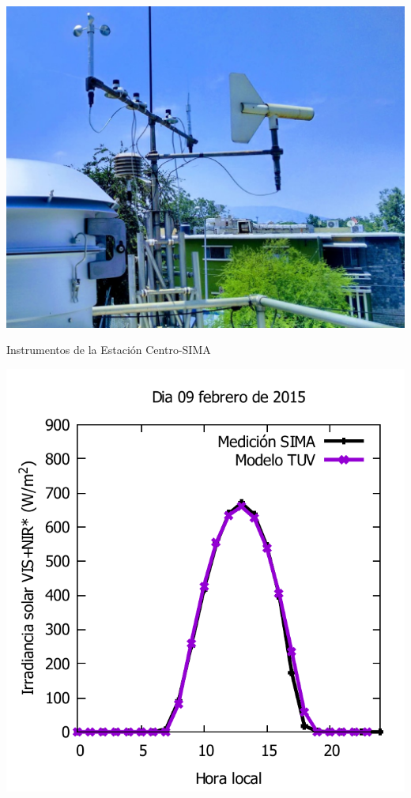 \documentclass{article}
\begin{document}
\begin{multicols}{2}
\begin{center}
\begin{minipage}{0.5\linewidth}
\includegraphics[scale=0.23]{images/moni.eps}
\begin{center}
\textcolor{na}{Instrumentos de la Estación Centro-SIMA}
\end{center}
\end{minipage}
\begin{minipage}{0.47\linewidth}
\includegraphics[scale=0.47]{images/med1.pdf}

\end{minipage}
\end{center}
\end{multicols}
\end{document}
